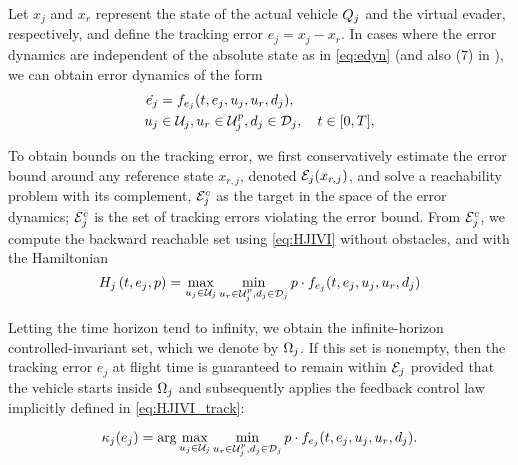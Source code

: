
Let $x_j$ and $x_r$ represent the state of the actual vehicle $Q_j$ and the virtual evader, respectively, and define the tracking error $e_j=x_j-x_r$. In cases where the error dynamics are independent of the absolute state as in \eqref{eq:edyn} (and also (7) in \cite{Mitchell05}), we can obtain error dynamics of the form
\begin{equation}
\label{eq:edyn} %
\begin{aligned}
\dot{e_j} &= f_{e_j}(t, e_j, u_j, u_r,d_j), \\
u_j &\in \cset_j, u_r\in\cset^p_j, d_j \in \dset_j, \quad t \in [0, T],
\end{aligned}
\end{equation}

To obtain bounds on the tracking error, we first conservatively estimate the error bound around any reference state $x_{r,j}$, denoted $\mathcal{E}_j(x_{r,j})$, and solve a reachability problem with its complement, $\mathcal{E}_j^c$ as the target in the space of the error dynamics; $\mathcal{E}_j^c$ is the set of tracking errors violating the error bound. From $\mathcal{E}_j^c$, we compute the backward reachable set using \eqref{eq:HJIVI} without obstacles, and with the Hamiltonian
\vspace{-0.5em}
\begin{equation}
\label{eq:HJIVI_track}
H_j\left(t, e_j, p\right) = \max_{u_j \in \mathcal{U}_j} \min_{u_r \in\mathcal{U}^p_j, d_j \in \mathcal{D}_j} p \cdot f_{e_j}(t, e_j, u_j, u_r,d_j)
\end{equation}

Letting the time horizon tend to infinity, we obtain the infinite-horizon controlled-invariant set, which we denote by $\Omega_j$. If this set is nonempty, then the tracking error $e_j$ at flight time is guaranteed to remain within $\mathcal{E}_j$ provided that the vehicle starts inside $\Omega_j$ and subsequently applies the feedback control law implicitly defined in \eqref{eq:HJIVI_track}:

\vspace{-1.5em}
\begin{equation}
\label{eq:robust_tracking_law}
\kappa_j(e_j) = \arg\max_{u_j \in \mathcal{U}_j} \min_{u_r \in\mathcal{U}^p_j, d_j \in \mathcal{D}_j} p \cdot f_{e_j}(t,e_j,u_j,u_r,d_j).
\end{equation}

